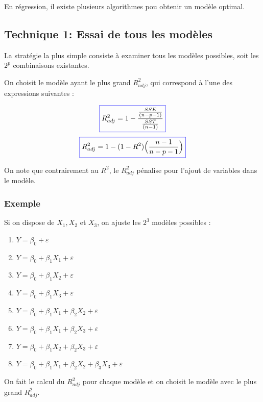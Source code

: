 \documentclass[11pt,french]{report}
\begin{document}
En régression, il existe plusieurs algorithmes pou obtenir un modèle optimal.

\subsection{Technique 1: Essai de tous les modèles}
\label{tech1}

La stratégie la plus simple consiste à examiner tous les modèles possibles, soit les $2^p$ combinaisons existantes. \newline

On choisit le modèle ayant le plus grand $R^2_{adj}$, qui correspond à l'une des expressions suivantes :

\begin{equation}
\color{blue}
\boxed{\color{black}
R^2_{adj} = 1 - \frac{\frac{SSE}{(n-p-1)}}{\frac{SST}{(n-1)}} 
}
\end{equation}
\begin{equation}
\color{blue}
\boxed{\color{black}
R^2_{adj} = 1 - (1 - R^2) \Big(\frac{n-1}{n-p-1} \Big) 
}
\end{equation}

On note que contrairement au $R^2$, le $R^2_{adj}$ pénalise pour l'ajout de variables dans le modèle.

\bigskip
\subsubsection*{Exemple}
Si on dispose de $X_1, X_2$ et $X_3$, on ajuste les $2^3$ modèles possibles :
\begin{enumerate}
\item $Y = \beta_0 + \varepsilon$
\item $Y = \beta_0 + \beta_1X_1 + \varepsilon$
\item $Y = \beta_0 + \beta_1X_2 + \varepsilon$
\item $Y = \beta_0 + \beta_1X_3 + \varepsilon$
\item $Y = \beta_0 + \beta_1X_1 + \beta_2X_2 + \varepsilon$
\item $Y = \beta_0 + \beta_1X_1 + \beta_2X_3 + \varepsilon$
\item $Y = \beta_0 + \beta_1X_2 + \beta_2X_3 + \varepsilon$
\item $Y = \beta_0 + \beta_1X_1 + \beta_2X_2 + \beta_3X_3 + \varepsilon$
\end{enumerate}
\bigskip
On fait le calcul du $R^2_{adj}$ pour chaque modèle et on choisit le modèle avec le plus grand $R^2_{adj}$.
\end{document}
